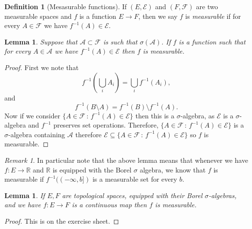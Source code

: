 \documentclass[11pt]{article}
\newtheorem{lem}[thm]{Lemma}
\theoremstyle{definition}
\newtheorem{dfn}[thm]{Definition}
\theoremstyle{remark}
\newtheorem{remark}[thm]{Remark}
\begin{document}
\begin{dfn}[Mesasurable functions]
If $(E, \mathcal{E})$ and $(F, \mathcal{F})$ are two measurable spaces and $f$ is a function $E \rightarrow F$, then we say $f$ is \emph{measurable} if for every $A \in \mathcal{F}$ we have $f^{-1}(A) \in \mathcal{E}$.
\end{dfn}

\begin{lem} Suppose that $\mathcal{A} \subset \mathcal{F}$ is such that $\sigma(\mathcal{A})$. If $f$ is a function such that for every $A \in \mathcal{A}$ we have $f^{-1}(A) \in \mathcal{E}$ then $f$ is measurable. 
\end{lem}
\begin{proof}
First we note that
\[ f^{-1}\left( \bigcup_i A_i \right) = \bigcup_i f^{-1}(A_i), \] and
\[ f^{-1}(B \setminus A) = f^{-1}(B) \setminus f^{-1}(A). \] Now if we consider $\{ A \in \mathcal{F} \, :\, f^{-1}(A) \in \mathcal{E}\}$ then this is a $\sigma$-algebra, as $\mathcal{E}$ is a $\sigma$-algebra and $f^{-1}$ preserves set operations. Therefore, $\{ A \in \mathcal{F} \, :\, f^{-1}(A) \in \mathcal{E}\}$ is a $\sigma$-algebra containing $\mathcal{A}$ therefore $\mathcal{E} \subseteq  \{ A \in \mathcal{F} \, :\, f^{-1}(A) \in \mathcal{E}\}$ so $f$ is measurable.
\end{proof}

\begin{remark}
In particular note that the above lemma means that whenever we have $f: E \rightarrow \mathbb{R}$ and $\mathbb{R}$ is equipped with the Borel $\sigma$ algebra, we know that $f$ is measurable if $f^{-1}((-\infty, b])$ is a measurable set for every $b$.
\end{remark}

\begin{lem}
If $E, F$ are topological spaces, equipped with their Borel $\sigma$-algebras, and we have $f:E \rightarrow F$ is a continuous map then $f$ is measurable.
\end{lem}
\begin{proof}
This is on the exercise sheet.
\end{proof}
\end{document}
